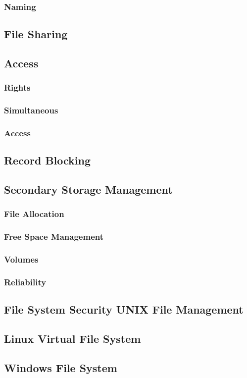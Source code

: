 \subsubsection{Naming}

\subsection{File Sharing}

\subsection{Access }

\subsubsection{Rights }

\subsubsection{Simultaneous}

\subsubsection{Access}

\subsection{Record Blocking}

\subsection{Secondary Storage Management}

\subsubsection{File Allocation}

\subsubsection{Free Space Management }

\subsubsection{Volumes}

\subsubsection{Reliability}

\subsection{File System Security UNIX File Management}

\subsection{Linux Virtual File System }
\subsection{Windows File System}

\biblio

